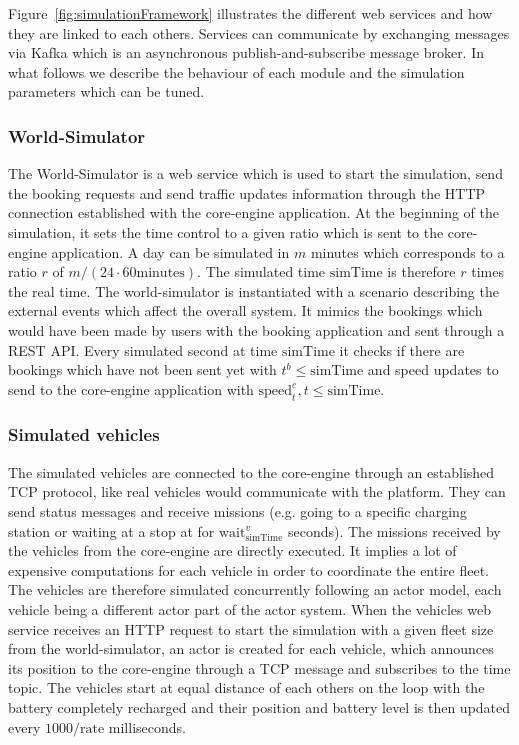 \documentclass[12pt,a4paper]{article}
\begin{document}
Figure~\ref{fig:simulationFramework} illustrates the different web services and how they are linked to each others. Services can communicate by exchanging messages via Kafka which is an asynchronous publish-and-subscribe message broker. In what follows we describe the behaviour of each module and the simulation parameters which can be tuned. 

\subsubsection{World-Simulator}
The World-Simulator is a web service which is used to start the simulation, send the booking requests and send traffic updates information through the HTTP connection established with the core-engine application. At the beginning of the simulation, it sets the time control to a given ratio which is sent to the core-engine application. A day can be simulated in $m$ minutes which corresponds to a ratio $r$ of $m / (24 \cdot 60 \text{minutes})$. The simulated time $\text{simTime}$ is therefore $r$ times the real time. The world-simulator is instantiated with a scenario describing the external events which affect the overall system. It mimics the bookings which would have been made by users with the booking application and sent through a REST API. Every simulated second at time $\text{simTime}$ it checks if there are bookings which have not been sent yet with $t^{b} \leq \text{simTime}$ and speed updates to send to the core-engine application with $\text{speed}_{t}^{e}, t \leq \text{simTime}$. 

\subsubsection{Simulated vehicles}\label{simvehicles}
The simulated vehicles are connected to the core-engine through an established TCP protocol, like real vehicles would communicate with the platform. They can send status messages and receive missions (e.g. going to a specific charging station or waiting at a stop at for $\text{wait}^{v}_{\text{simTime}}$ seconds). The missions received by the vehicles from the core-engine are directly executed. It implies a lot of expensive computations for each vehicle in order to coordinate the entire fleet. The vehicles are therefore simulated concurrently following an actor model, each vehicle being a different actor part of the actor system. When the vehicles web service receives an HTTP request to start the simulation with a given fleet size from the world-simulator, an actor is created for each vehicle, which announces its position to the core-engine through a TCP message and subscribes to the time topic. The vehicles start at equal distance of each others on the loop with the battery completely recharged and their position and battery level is then updated every $1000/\text{rate}$ milliseconds.  
\end{document}
